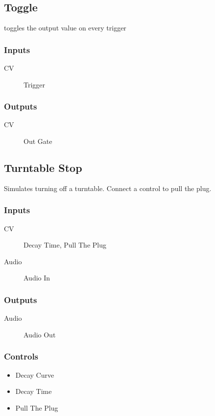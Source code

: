 \subsection{Toggle}

toggles the output value on every trigger



\subsubsection{Inputs}
\begin{description}
\item [CV] Trigger
\end{description}

\subsubsection{Outputs}
\begin{description}
\item [CV] Out Gate
\end{description}

\subsection{Turntable Stop}

Simulates turning off a turntable. Connect a control to pull the plug.



\subsubsection{Inputs}
\begin{description}
\item [CV] Decay Time, Pull The Plug
\item [Audio] Audio In
\end{description}

\subsubsection{Outputs}
\begin{description}
\item [Audio] Audio Out
\end{description}

\subsubsection{Controls}
\begin{itemize}
\item Decay Curve
\item Decay Time
\item Pull The Plug
\end{itemize}

